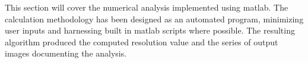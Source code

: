 \documentclass[../../../../main.tex]{subfiles}%
\begin{document}
%
    \Xsubsubsection%
    This section will cover the numerical analysis implemented using \gls{matlab}.
    The calculation methodology has been designed as an automated program, minimizing user inputs and harnessing built in \gls{matlab} scripts where possible.
    The resulting algorithm produced the computed resolution value and the series of output images documenting the analysis.
\end{document}
